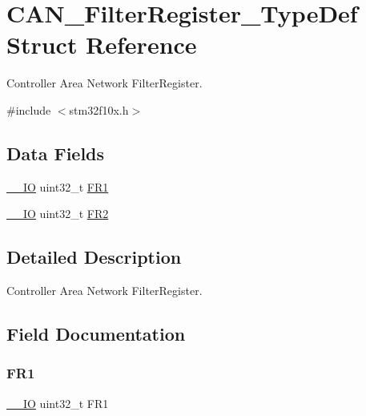 \hypertarget{struct_c_a_n___filter_register___type_def}{}\section{C\+A\+N\+\_\+\+Filter\+Register\+\_\+\+Type\+Def Struct Reference}
\label{struct_c_a_n___filter_register___type_def}


Controller Area Network Filter\+Register.  




{\ttfamily \#include $<$stm32f10x.\+h$>$}

\subsection*{Data Fields}
\begin{DoxyCompactItemize}
\item 
\mbox{\hyperlink{core__sc300_8h_aec43007d9998a0a0e01faede4133d6be}{\+\_\+\+\_\+\+IO}} uint32\+\_\+t \mbox{\hyperlink{struct_c_a_n___filter_register___type_def_a92036953ac673803fe001d843fea508b}{F\+R1}}
\item 
\mbox{\hyperlink{core__sc300_8h_aec43007d9998a0a0e01faede4133d6be}{\+\_\+\+\_\+\+IO}} uint32\+\_\+t \mbox{\hyperlink{struct_c_a_n___filter_register___type_def_a7f7d80b45b7574463d7030fc8a464582}{F\+R2}}
\end{DoxyCompactItemize}


\subsection{Detailed Description}
Controller Area Network Filter\+Register. 

\subsection{Field Documentation}
\mbox{\label{struct_c_a_n___filter_register___type_def_a92036953ac673803fe001d843fea508b}} 
\subsubsection{\texorpdfstring{FR1}{FR1}}
{\footnotesize\ttfamily \mbox{\hyperlink{core__sc300_8h_aec43007d9998a0a0e01faede4133d6be}{\+\_\+\+\_\+\+IO}} uint32\+\_\+t F\+R1}

